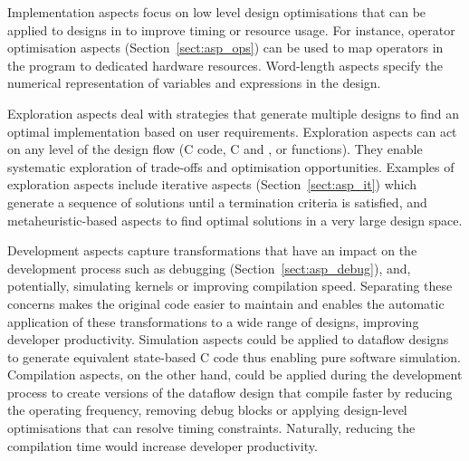 \vspace*{0.5ex}
 Implementation aspects focus on
low level design optimisations that can be applied to designs in
\MAXC{} to improve timing or resource usage. For instance, operator
optimisation aspects (Section~\ref{sect:asp_ops}) can be used to map
operators in the program to dedicated hardware resources. Word-length
aspects specify the numerical representation of variables and
expressions in the design.

\vspace*{0.5ex}
 Exploration aspects deal with
strategies that generate multiple designs to find an optimal
implementation based on user requirements. Exploration aspects can act
on any level of the design flow (C code, C and \MAXC{}, or \MAXC{}
functions). They enable systematic exploration of trade-offs and
optimisation opportunities. Examples of exploration aspects include
iterative aspects (Section~\ref{sect:asp_it}) which generate a
sequence of solutions until a termination criteria is satisfied, and
metaheuristic-based aspects to find optimal solutions in a very large
design space.

\vspace*{0.5ex}
 Development aspects capture
transformations that have an impact on the development process such as
debugging (Section~\ref{sect:asp_debug}), and, potentially, simulating
kernels or improving compilation speed. Separating these concerns
makes the original code easier to maintain and enables the automatic
application of these transformations to a wide range of designs,
improving developer productivity. Simulation aspects could be applied
to dataflow designs to generate equivalent state-based C code thus
enabling pure software simulation. Compilation aspects, on the other
hand, could be applied during the development process to create
versions of the dataflow design that compile faster by reducing the
operating frequency, removing debug blocks or applying design-level
optimisations that can resolve timing constraints. Naturally, reducing
the compilation time would increase developer productivity.


